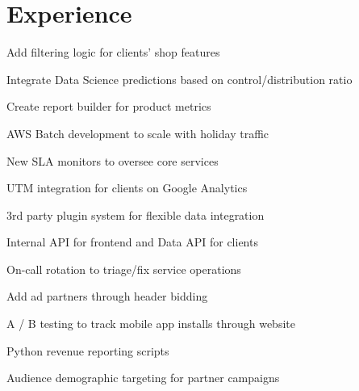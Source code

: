 \documentclass[]{deedy-resume-openfont}
\begin{document}
\begin{minipage}[t]{0.66\textwidth}


\section{Experience}

\vspace{\topsep} %
\begin{tightemize}
\item Add filtering logic for clients' shop features
\item Integrate Data Science predictions based on control/distribution ratio
\item Create report builder for product metrics
\item AWS Batch development to scale with holiday traffic
\item New SLA monitors to oversee core services
\item UTM integration for clients on Google Analytics
\item 3rd party plugin system for flexible data integration
\item Internal API for frontend and Data API for clients
\item On-call rotation to triage/fix service operations
\end{tightemize}
\sectionsep

\begin{tightemize}
\item Add ad partners through header bidding
\item A / B testing to track mobile app installs through website
\item Python revenue reporting scripts
\item Audience demographic targeting for partner campaigns
\end{tightemize}
\sectionsep


\end{minipage}
\end{document}
